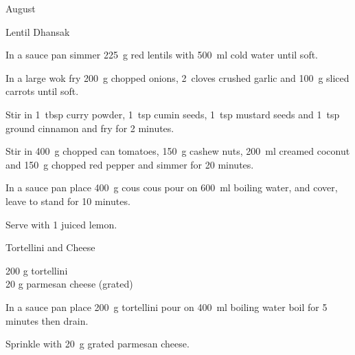 \begin{menu}{August}
\begin{recipe}{2}{Lentil Dhansak}
	
	
    \begin{instructions}
    \item 
        In a sauce pan simmer
        225~g  red lentils
        with 500~ml  cold water
        until soft.
      \item 
        In a large wok fry
        200~g chopped onions,
        2~cloves crushed garlic
        and
        100~g sliced carrots
        until soft.
      \item 
        Stir in
        1~tbsp  curry powder,
        1~tsp  cumin seeds,
        1~tsp  mustard seeds
        and
        1~tsp  ground cinnamon
        and fry for 2 minutes.
      \item 
        Stir in
        400~g chopped can tomatoes,
        150~g  cashew nuts,
        200~ml  creamed coconut
        and
        150~g chopped red pepper
        and simmer for 20 minutes.
      \item 
    In a
    sauce pan 
    place
    400~g  cous cous
    pour on
    600~ml  boiling water,
    and cover, leave to stand for 10 minutes.
  \item 
        Serve with
        1 juiced lemon.
      
    \end{instructions}
    \end{recipe}%
  
    \begin{recipe}{1}{Tortellini and Cheese}%
		\begin{ingredients}
		200 g tortellini  \\
	20 g parmesan cheese (grated) \\
	
		\end{ingredients}
	
	
    \begin{instructions}
    \item 
    In a
    sauce pan
    place
    200~g  tortellini
    pour on
    400~ml  boiling water
    boil for 5 minutes then drain.
  \item 
        Sprinkle with
        20~g grated parmesan cheese.
      
    \end{instructions}
    \end{recipe}%
  
    \clearpage
    \end{menu}
	
